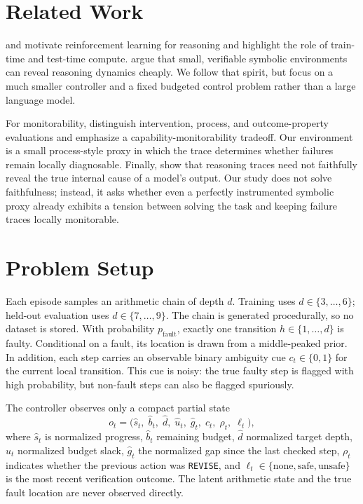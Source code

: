 \documentclass{article}
\begin{document}
\section{Related Work}
\citet{openai_reasoning_2024} and \citet{deepseek_r1_2025} motivate reinforcement learning for reasoning and highlight the role of train-time and test-time compute. \citet{logic_rl_2025} argue that small, verifiable symbolic environments can reveal reasoning dynamics cheaply. We follow that spirit, but focus on a much smaller controller and a fixed budgeted control problem rather than a large language model.

For monitorability, \citet{openai_monitorability_2025} distinguish intervention, process, and outcome-property evaluations and emphasize a capability-monitorability tradeoff. Our environment is a small process-style proxy in which the trace determines whether failures remain locally diagnosable. Finally, \citet{anthropic_faithfulness_2025} show that reasoning traces need not faithfully reveal the true internal cause of a model's output. Our study does not solve faithfulness; instead, it asks whether even a perfectly instrumented symbolic proxy already exhibits a tension between solving the task and keeping failure traces locally monitorable.

\section{Problem Setup}
Each episode samples an arithmetic chain of depth $d$. Training uses $d \in \{3,\ldots,6\}$; held-out evaluation uses $d \in \{7,\ldots,9\}$. The chain is generated procedurally, so no dataset is stored. With probability $p_{\mathrm{fault}}$, exactly one transition $h \in \{1,\ldots,d\}$ is faulty. Conditional on a fault, its location is drawn from a middle-peaked prior. In addition, each step carries an observable binary ambiguity cue $c_t \in \{0,1\}$ for the current local transition. This cue is noisy: the true faulty step is flagged with high probability, but non-fault steps can also be flagged spuriously.

The controller observes only a compact partial state
\begin{equation}
o_t = \bigl(\hat{s}_t,\; \hat{b}_t,\; \hat{d},\; \hat{u}_t,\; \hat{g}_t,\; c_t,\; \rho_t,\; \ell_t\bigr),
\end{equation}
where $\hat{s}_t$ is normalized progress, $\hat{b}_t$ remaining budget, $\hat{d}$ normalized target depth, $\hat{u}_t$ normalized budget slack, $\hat{g}_t$ the normalized gap since the last checked step, $\rho_t$ indicates whether the previous action was \texttt{REVISE}, and $\ell_t \in \{\text{none}, \text{safe}, \text{unsafe}\}$ is the most recent verification outcome. The latent arithmetic state and the true fault location are never observed directly.
\end{document}
